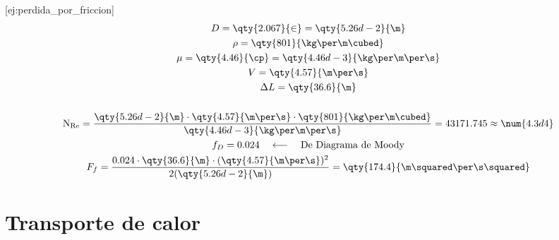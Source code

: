 [ej:perdida_por_friccion]{
\begin{gather*}
    D = \qty{2.067}{\in} = \qty{5.26d-2}{\m}
    \\
    \rho = \qty{801}{\kg\per\m\cubed}
    \\
    \mu = \qty{4.46}{\cp} = \qty{4.46d-3}{\kg\per\m\per\s}
    \\
    V = \qty{4.57}{\m\per\s}
    \\
    \Delta L = \qty{36.6}{\m}
    \\\\
    \mathrm{N_{Re}} = \frac{\qty{5.26d-2}{\m} \cdot \qty{4.57}{\m\per\s} \cdot \qty{801}{\kg\per\m\cubed}}{\qty{4.46d-3}{\kg\per\m\per\s}} = 43171.745 \approx \num{4.3d4}
    \\
    f_{D} = 0.024 \quad\longleftarrow\quad \text{De Diagrama de Moody}
    \\
    F_{f} = \frac{0.024 \cdot \qty{36.6}{\m} \cdot (\qty{4.57}{\m\per\s})^{2}}{2(\qty{5.26d-2}{\m})} = \qty{174.4}{\m\squared\per\s\squared}
\end{gather*}
}




    \section{Transporte de calor}


